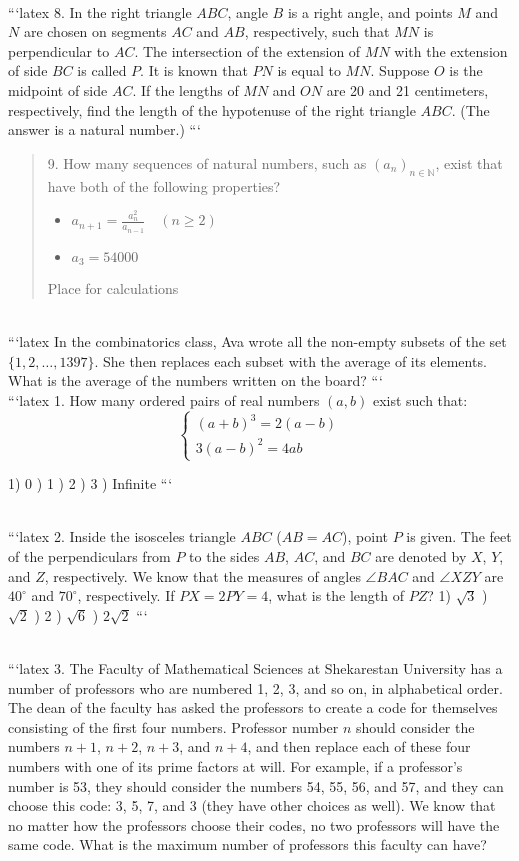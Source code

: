 \\
```latex
8. In the right triangle $ABC$, angle $B$ is a right angle, and points $M$ and $N$ are chosen on segments $AC$ and $AB$, respectively, such that $MN$ is perpendicular to $AC$. The intersection of the extension of $MN$ with the extension of side $BC$ is called $P$. It is known that $PN$ is equal to $MN$. Suppose $O$ is the midpoint of side $AC$. If the lengths of $MN$ and $ON$ are 20 and 21 centimeters, respectively, find the length of the hypotenuse of the right triangle $ABC$. (The answer is a natural number.)
```
\\
\begin{quote}
9. How many sequences of natural numbers, such as $(a_n)_{n \in \mathbb{N}}$, exist that have both of the following properties?
\begin{itemize}
    \item $a_{n+1} = \frac{a_n^2}{a_{n-1}} \quad (n \geq 2)$
    \item $a_3 = 54000$
\end{itemize}

Place for calculations
\end{quote}
\\
```latex
In the combinatorics class, Ava wrote all the non-empty subsets of the set $\{1, 2, \ldots, 1397\}$. She then replaces each subset with the average of its elements. What is the average of the numbers written on the board?
```
\\
```latex
1. How many ordered pairs of real numbers $(a, b)$ exist such that: 
\[
\begin{cases} 
(a+b)^3 = 2(a-b) \\
3(a-b)^2 = 4ab 
\end{cases}
\]

1) 0 ) 1 ) 2 ) 3 ) Infinite
```

\\
```latex
2. Inside the isosceles triangle $ABC$ ($AB = AC$), point $P$ is given. The feet of the perpendiculars from $P$ to the sides $AB$, $AC$, and $BC$ are denoted by $X$, $Y$, and $Z$, respectively. We know that the measures of angles $\angle BAC$ and $\angle XZY$ are $40^\circ$ and $70^\circ$, respectively. If $PX = 2PY = 4$, what is the length of $PZ$? 
1) \(\sqrt{3}\) ) \(\sqrt{2}\) ) 2 ) \(\sqrt{6}\) ) \(2\sqrt{2}\)
```

\\
```latex
3. The Faculty of Mathematical Sciences at Shekarestan University has a number of professors who are numbered 1, 2, 3, and so on, in alphabetical order. The dean of the faculty has asked the professors to create a code for themselves consisting of the first four numbers. Professor number $n$ should consider the numbers $n+1$, $n+2$, $n+3$, and $n+4$, and then replace each of these four numbers with one of its prime factors at will. For example, if a professor's number is 53, they should consider the numbers 54, 55, 56, and 57, and they can choose this code: 3, 5, 7, and 3 (they have other choices as well). We know that no matter how the professors choose their codes, no two professors will have the same code. What is the maximum number of professors this faculty can have?

